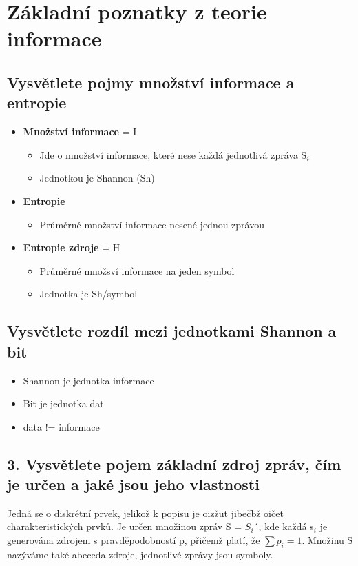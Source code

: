 \clearpage
\section{Základní poznatky z teorie informace}
\subsection{Vysvětlete pojmy množství informace a entropie}
\begin{itemize}
    \item \textbf{Množství informace} = I
    \begin{itemize}
        \item Jde o množství informace, které nese  každá jednotlivá zpráva S$_i$
        \item Jednotkou je Shannon (Sh)
    \end{itemize}
    \item \textbf{Entropie} 
    \begin{itemize}
        \item Průměrné množství informace nesené jednou zprávou
    \end{itemize}
    \item \textbf{Entropie zdroje} = H
    \begin{itemize}
        \item Průměrné množsví informace na jeden symbol
        \item Jednotka je Sh/symbol
    \end{itemize}
\end{itemize}

\subsection{ Vysvětlete rozdíl mezi jednotkami Shannon a bit}
\begin{itemize}
    \item Shannon je jednotka informace
    \item Bit je jednotka dat
    \item data != informace
\end{itemize}

\subsection{3.	Vysvětlete pojem základní zdroj zpráv, čím je určen a jaké jsou jeho vlastnosti}
Jedná se o diskrétní prvek, jelikož k popisu je oizžut jibečbž oičet charakteristických prvků.
Je určen množinou zpráv S = ${S_i}$´, kde každá s$_i$ je generována zdrojem s pravděpodobností p, přičemž platí, že $\sum p_i = 1$.
Množinu S nazýváme také abeceda zdroje, jednotlivé zprávy jsou symboly.

